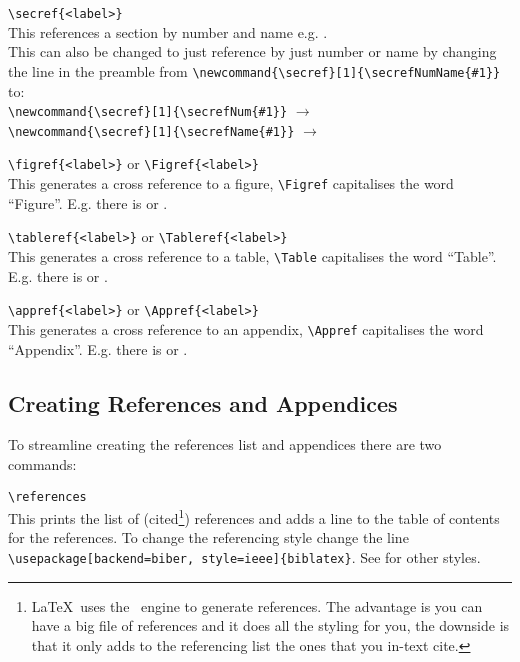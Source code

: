 \documentclass[a4paper, 12pt, english]{article}
\begin{document}
            \verb+\secref{<label>}+\\
            This references a section by number and name e.g. .\\
            This can also be changed to just reference by just number or name by changing the line in the preamble from \verb+\newcommand{\secref}[1]{\secrefNumName{#1}}+ to:\\
            \verb+\newcommand{\secref}[1]{\secrefNum{#1}}+ $\rightarrow$ \\
            \verb+\newcommand{\secref}[1]{\secrefName{#1}}+ $\rightarrow$ 
            
            \verb+\figref{<label>}+ or \verb+\Figref{<label>}+\\
            This generates a cross reference to a figure, \verb+\Figref+ capitalises the word ``Figure''. E.g. there is  or .

            \verb+\tableref{<label>}+ or \verb+\Tableref{<label>}+\\
            This generates a cross reference to a table, \verb+\Table+ capitalises the word ``Table''. E.g. there is  or .

            \verb+\appref{<label>}+ or \verb+\Appref{<label>}+\\
            This generates a cross reference to an appendix, \verb+\Appref+ capitalises the word ``Appendix''. E.g. there is  or .


        \newpage

        \subsection{Creating References and Appendices}
            \label{subsec: creating references and appendices}

            To streamline creating the references list and appendices there are two commands:

            \verb+\references+\\
            This prints the list of (cited\footnote{\LaTeX~uses the \BibTeX~engine to generate references. The advantage is you can have a big file of references and it does all the styling for you, the downside is that it only adds to the referencing list the ones that you in-text cite.}) references and adds a line to the table of contents for the references. To change the referencing style change the line \\\verb+\usepackage[backend=biber, style=ieee]{biblatex}+. See \textcite{referencing-styles} for other styles.
\end{document}
